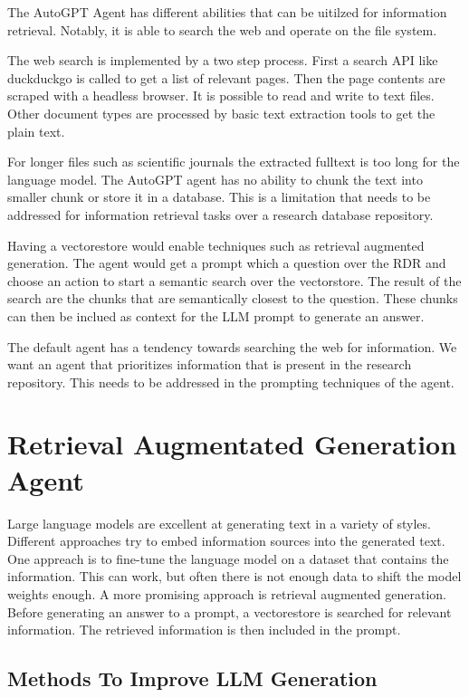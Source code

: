 \documentclass[english, version-2022-01]{uzl-thesis}
\begin{document}
The AutoGPT Agent has different abilities that can be uitilzed for information retrieval. Notably, it is able to search the web and operate on the file system.

The web search is implemented by a two step process. First a search API like duckduckgo is called to get a list of relevant pages. Then the page contents are scraped with a headless browser. It is possible to read and write to text files. Other document types are processed by basic text extraction tools to get the plain text.

For longer files such as scientific journals the extracted fulltext is too long for the language model. The AutoGPT agent has no ability to chunk the text into smaller chunk or store it in a database. This is a limitation that needs to be addressed for information retrieval tasks over a research database repository.

Having a vectorestore would enable techniques such as retrieval augmented generation. The agent would get a prompt which a question over the RDR and choose an action to start a semantic search over the vectorstore. The result of the search are the chunks that are semantically closest to the question. These chunks can then be inclued as context for the LLM prompt to generate an answer.

The default agent has a tendency towards searching the web for information. We want an agent that prioritizes information that is present in the research repository. This needs to be addressed in the prompting techniques of the agent.

\chapter{Retrieval Augmentated Generation Agent}

Large language models are excellent at generating text in a variety of styles. Different approaches try to embed information sources into the generated text. One appreach is to fine-tune the language model on a dataset that contains the information. This can work, but often there is not enough data to shift the model weights enough. A more promising approach is retrieval augmented generation. Before generating an answer to a prompt, a vectorestore is searched for relevant information. The retrieved information is then included in the prompt.

\section{Methods To Improve LLM Generation}
\end{document}
